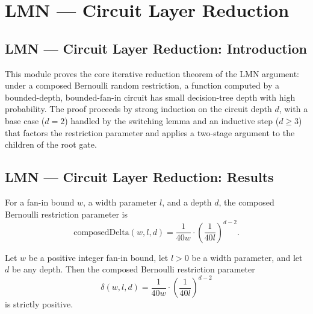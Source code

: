 \section{LMN --- Circuit Layer Reduction}
\subsection*{LMN --- Circuit Layer Reduction: Introduction}

This module proves the core iterative reduction theorem of the LMN argument: under a
composed Bernoulli random restriction, a function computed by a bounded-depth, bounded-fan-in
circuit has small decision-tree depth with high probability. The proof proceeds by strong
induction on the circuit depth $d$, with a base case ($d=2$) handled by the switching lemma
and an inductive step ($d\ge 3$) that factors the restriction parameter and applies a
two-stage argument to the children of the root gate.

\subsection*{LMN --- Circuit Layer Reduction: Results}

\begin{definition}
\label{LMN.composedDelta}
\leanok
{}
For a fan-in bound $w$, a width parameter $l$, and a depth $d$, the composed Bernoulli
restriction parameter is
\[
  \mathrm{composedDelta}(w,l,d) = \frac{1}{40w}\cdot\left(\frac{1}{40l}\right)^{d-2}.
\]
\end{definition}

\begin{lemma}
\label{LMN.composedDelta_pos}
\leanok
{}
Let $w$ be a positive integer fan-in bound, let $l > 0$ be a width parameter, and let
$d$ be any depth. Then the composed Bernoulli restriction parameter
\[
  \delta(w,l,d) = \frac{1}{40w}\cdot\left(\frac{1}{40l}\right)^{d-2}
\]
is strictly positive.
\end{lemma}

